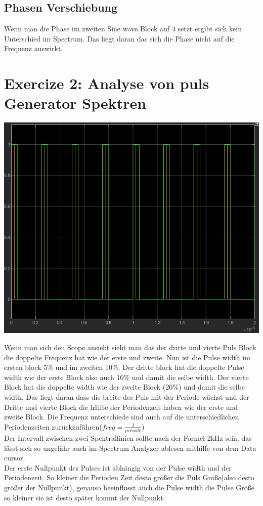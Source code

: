 \documentclass{scrartcl}
\begin{document}
\subsection*{Phasen Verschiebung}
Wenn man die Phase im zweiten Sine wave Block auf $4$ setzt ergibt sich kein Unterschied im Spectrum. Das liegt daran das sich die Phase nicht auf die Frequenz auswirkt.\\

\section*{Exercize 2: Analyse von puls Generator Spektren}

\includegraphics[scale=0.5]{PulseScope.png}

Wenn man sich den Scope ansieht sieht man das der dritte und vierte Puls Block die doppelte Frequenz hat wie der erste und zweite. Nun ist die Pulse width im ersten block 5\% und im zweiten 10\%. Der dritte block hat die doppelte Pulse width wie der erste Block also auch 10\% und damit die selbe width. Der vierte Block hat die doppelte width wie der zweite Block (20\%) und damit die selbe width. Das liegt daran dass die breite des Puls mit der Periode wächst und der Dritte und vierte Block die hälfte der Periodenzeit haben wie der erste und zweite Block. Die Frequenz unterschiede sind auch auf die unterschiedlichen Periodenzeiten zurückzuführen($freq = \frac1{periode}$) \\ 

Der Intervall zwischen zwei Spektrallinien sollte nach der Formel 2kHz sein, das lässt sich so ungefähr auch im Spectrum Analyzer ablesen mithilfe von dem Data cursor.\\ %
Der erste Nullpunkt des Pulses ist abhängig von der Pulse width und der Periodenzeit. So kleiner die Perioden Zeit desto größer die Puls Größe(also desto größer der Nullpunkt), genauso beeinflusst auch die Pulse width die Pulse Größe so kleiner sie ist desto später kommt der Nullpunkt.\\
\end{document}

